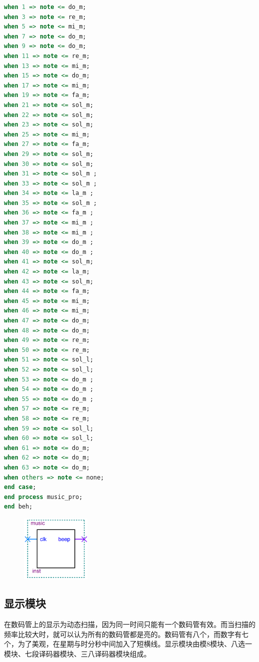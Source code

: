 \documentclass[12pt]{article}
\begin{document}
\begin{lstlisting}[language=VHDL]
when 1 => note <= do_m;
when 3 => note <= re_m;
when 5 => note <= mi_m;
when 7 => note <= do_m;
when 9 => note <= do_m;
when 11 => note <= re_m;
when 13 => note <= mi_m;
when 15 => note <= do_m;
when 17 => note <= mi_m;
when 19 => note <= fa_m;
when 21 => note <= sol_m;
when 22 => note <= sol_m;
when 23 => note <= sol_m;
when 25 => note <= mi_m;
when 27 => note <= fa_m;
when 29 => note <= sol_m;
when 30 => note <= sol_m;
when 31 => note <= sol_m ;
when 33 => note <= sol_m ;
when 34 => note <= la_m ;
when 35 => note <= sol_m ;
when 36 => note <= fa_m ;
when 37 => note <= mi_m ;
when 38 => note <= mi_m ;
when 39 => note <= do_m ;
when 40 => note <= do_m ;
when 41 => note <= sol_m;
when 42 => note <= la_m;
when 43 => note <= sol_m;
when 44 => note <= fa_m;
when 45 => note <= mi_m;
when 46 => note <= mi_m;
when 47 => note <= do_m;
when 48 => note <= do_m;
when 49 => note <= re_m;
when 50 => note <= re_m;
when 51 => note <= sol_l;
when 52 => note <= sol_l;
when 53 => note <= do_m ;
when 54 => note <= do_m ;
when 55 => note <= do_m ;
when 57 => note <= re_m;
when 58 => note <= re_m;
when 59 => note <= sol_l;
when 60 => note <= sol_l;
when 61 => note <= do_m;
when 62 => note <= do_m;
when 63 => note <= do_m;
when others => note <= none;
end case;
end process music_pro;
end beh;
\end{lstlisting} 
\begin{figure}[hp]
	\centering  
	\includegraphics[width=0.3\textwidth]{picture/music.png} 
	\caption{}
	\label{fig:music}   
\end{figure}\par
\subsection{显示模块}
在数码管上的显示为动态扫描，因为同一时间只能有一个数码管有效。而当扫描的频率比较大时，就可以认为所有的数码管都是亮的。数码管有八个，而数字有七个，为了美观，在星期与时分秒中间加入了短横线。显示模块由模8模块、八选一模块、七段译码器模块、三八译码器模块组成。
\end{document}

